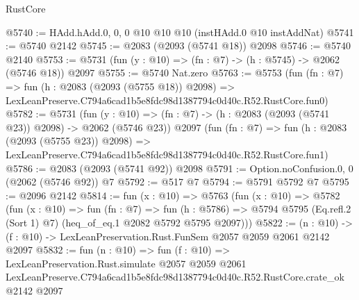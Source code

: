 \begin{lexlean}{RustCore}
\begin{coremodule}
@5740 := HAdd.hAdd.{0, 0, 0} @10 @10 @10 (instHAdd.{0} @10 instAddNat)
@5741 := @5740 @2142
@5745 := @2083 (@2093 (@5741 @18)) @2098
@5746 := @5740 @2140
@5753 := @5731 (fun (y : @10) => (fn : @7) -> (h : @5745) -> @2062 (@5746 @18)) @2097
@5755 := @5740 Nat.zero
@5763 := @5753
    (fun (fn : @7) =>
    fun (h : @2083 (@2093 (@5755 @18)) @2098) =>
    LexLeanPreserve.C794a6cad1b5e8fdc98d1387794c0d40c.R52.RustCore.fun0)
@5782 := @5731
    (fun (y : @10) => (fn : @7) -> (h : @2083 (@2093 (@5741 @23)) @2098) -> @2062 (@5746 @23))
    @2097
    (fun (fn : @7) =>
    fun (h : @2083 (@2093 (@5755 @23)) @2098) =>
    LexLeanPreserve.C794a6cad1b5e8fdc98d1387794c0d40c.R52.RustCore.fun1)
@5786 := @2083 (@2093 (@5741 @92)) @2098
@5791 := Option.noConfusion.{0, 0} (@2062 (@5746 @92)) @7
@5792 := @517 @7
@5794 := @5791 @5792 @7
@5795 := @2096 @2142
@5814 := fun (x : @10) =>
  @5763
    (fun (x : @10) =>
    @5782
      (fun (x : @10) =>
      fun (fn : @7) =>
      fun (h : @5786) =>
      @5794 @5795 (Eq.refl.{2} (Sort 1) @7) (heq_of_eq.{1} @2082 @5792 @5795 @2097)))
@5822 := (n : @10) -> (f : @10) -> LexLeanPreservation.Rust.FunSem @2057 @2059 @2061 @2142 @2097
@5832 := fun (n : @10) =>
  fun (f : @10) =>
  LexLeanPreservation.Rust.simulate
    @2057
    @2059
    @2061
    LexLeanPreserve.C794a6cad1b5e8fdc98d1387794c0d40c.R52.RustCore.crate_ok
    @2142
    @2097
\end{coremodule}
\end{lexlean}
